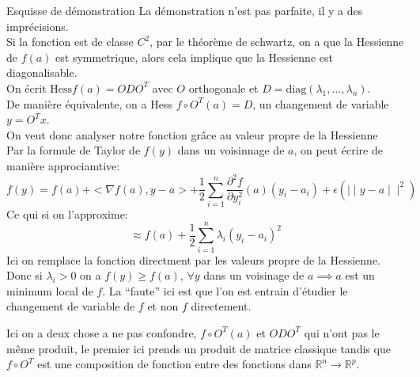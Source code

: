        \begin{parag}{Esquisse de démonstration}
           La démonstration n'est pas parfaite, il y a des imprécisions.\\
           Si la fonction est de classe $C^2$, par le théorème de schwartz, on a que la Hessienne de $f\left(a\right)$ est symmetrique, alors cela implique que la Hessienne est diagonalisable.\\
           On écrit $\text{Hess}f\left(a\right) = ODO^T$ avec $O$ orthogonale et $D = \text{diag}\left(\lambda_1, \ldots, \lambda_n\right)$.\\
           De manière équivalente, on a Hess $f \circ O^T\left(a\right) = D$, un changement de variable $y = O^Tx$. \\
           On veut donc analyser notre fonction grâce au valeur propre de la Hessienne\\
           Par la formule de Taylor de $f\left(y\right)$ dans un voisinnage de $a$, on peut écrire de manière approciamtive:
           \begin{equation*} f\left(y\right) = f\left(a\right) + <\nabla f\left(a\right), y-a> + \frac{1}{2}\sum_{i = 1}^{n} \frac{\partial^2 f}{\partial y_i^2}\left(a\right)\left(y_i - a_i\right) + \epsilon\left( \mid\mid y - a\mid\mid^2\right)  \end{equation*}
           Ce qui si on l'approxime:
           \begin{equation*} \approx f\left(a\right) +   \frac{1}{2}\sum_{i = 1}^{n} \lambda_i\left(y_i - a_i\right)^2 \end{equation*}
           Ici on remplace la fonction directment par les valeurs propre de la Hessienne.
           Donc si $\lambda_i > 0$ on  a $f\left(y\right) \geq f\left(a\right)$, $\forall y$ dans un voisinage de $a \implies a$ est un minimum local de $f$. La ``faute'' ici est que l'on est entrain d'étudier le changement de variable de $f$ et non $f$ directement.

\begin{framedremark}
    Ici on a deux chose a ne pas confondre, $f \circ O^T\left(a\right)$ et $ODO^T$ qui n'ont pas le même produit, le premier ici prends un produit de matrice classique tandis que $f \circ O^T$ est une composition de fonction entre des fonctions dans $\mathbb{R}^n \to \mathbb{R}^p$.
\end{framedremark}
           
       \end{parag}
